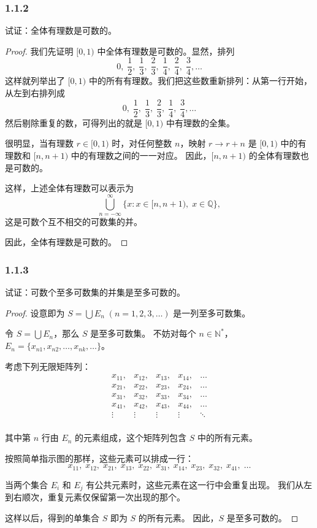 \documentclass[12pt]{ctexart}
\begin{document}
\subsubsection*{1.1.2} 
试证：全体有理数是可数的。
\begin{proof}
我们先证明 $[0, 1)$ 中全体有理数是可数的。显然，排列
\[
0, \; \frac{1}{2}, \; \frac{1}{3}, \; \frac{2}{3}, \; \frac{1}{4}, \; \frac{2}{4}, \;\frac{3}{4}, \ldots
\]
这样就列举出了 $[0, 1)$ 中的所有有理数。我们把这些数重新排列：从第一行开始，从左到右排列成
\[
0, \; \frac{1}{2}, \; \frac{1}{3}, \; \frac{2}{3}, \; \frac{1}{4}, \; \frac{3}{4}, \ldots
\]
然后剔除重复的数，可得列出的就是 $[0, 1)$ 中有理数的全集。

很明显，当有理数 $r \in [0, 1)$ 时，对任何整数 $n$，映射 $r \to r + n$ 是 $[0, 1)$ 中的有理数和 $[n, n+1)$ 中的有理数之间的一一对应。  
因此，$[n, n+1)$ 的全体有理数也是可数的。

这样，上述全体有理数可以表示为
\[
\bigcup_{n=-\infty}^{\infty} \{x : x \in [n, n+1), \; x \in \mathbb{Q}\},
\]
这是可数个互不相交的可数集的并。

因此，全体有理数是可数的。
\end{proof}

\subsubsection*{1.1.3} 
试证：可数个至多可数集的并集是至多可数的。
\begin{proof}
设意即为 $S = \bigcup E_n \; (n = 1, 2, 3, \ldots)$ 是一列至多可数集。

令 $S = \bigcup E_n$，那么 $S$ 是至多可数集。  
不妨对每个 $n \in \mathbb{N}^*$，$E_n = \{x_{n1}, x_{n2}, \ldots, x_{nk}, \ldots\}$。

考虑下列无限矩阵列：
\[
\begin{array}{ccccccc}
x_{11}, & x_{12}, & x_{13}, & x_{14}, & \ldots \\
x_{21}, & x_{22}, & x_{23}, & x_{24}, & \ldots \\
x_{31}, & x_{32}, & x_{33}, & x_{34}, & \ldots \\
x_{41}, & x_{42}, & x_{43}, & x_{44}, & \ldots \\
\vdots & \vdots & \vdots & \vdots & \ddots \\
\end{array}
\]

其中第 $n$ 行由 $E_n$ 的元素组成，这个矩阵列包含 $S$ 中的所有元素。

按照简单指示图的那样，这些元素可以排成一行：
\[
x_{11}, \; x_{12}, \; x_{21}, \; x_{13}, \; x_{22}, \; x_{31}, \; x_{14}, \; x_{23}, \; x_{32}, \; x_{41}, \; \ldots
\]

当两个集合 $E_i$ 和 $E_j$ 有公共元素时，这些元素在这一行中会重复出现。  
我们从左到右顺次，重复元素仅保留第一次出现的那个。

这样以后，得到的单集合 $S$ 即为 $S$ 的所有元素。  
因此，$S$ 是至多可数的。
\end{proof}
\end{document}
